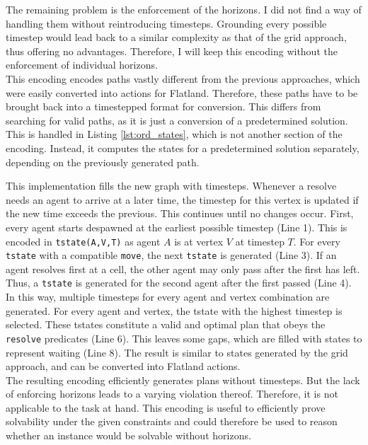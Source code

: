 \documentclass{llncs}
\begin{document}
\begin{multicols*}{2}
The remaining problem is the enforcement of the horizons. I did not find a way of handling them without reintroducing timesteps. Grounding every possible timestep would lead back to a similar complexity as that of the grid approach, thus offering no advantages. Therefore, I will keep this encoding without the enforcement of individual horizons.\\

This encoding encodes paths vastly different from the previous approaches, which were easily converted into actions for Flatland. Therefore, these paths have to be brought back into a timestepped format for conversion. This differs from searching for valid paths, as it is just a conversion of a predetermined solution. This is handled in Listing \ref{lst:ord_states}, which is not another section of the encoding. Instead, it computes the states for a predetermined solution separately, depending on the previously generated path.

This implementation fills the new graph with timesteps. Whenever a resolve needs an agent to arrive at a later time, the timestep for this vertex is updated if the new time exceeds the previous. This continues until no changes occur. First, every agent starts despawned at the earliest possible timestep (Line 1). This is encoded in \texttt{tstate(A,V,T)} as agent $A$ is at vertex $V$ at timestep $T$. For every \texttt{tstate} with a compatible \texttt{move}, the next \texttt{tstate} is generated (Line 3). If an agent resolves first at a cell, the other agent may only pass after the first has left. Thus, a \texttt{tstate} is generated for the second agent after the first passed (Line 4). In this way, multiple timesteps for every agent and vertex combination are generated. For every agent and vertex, the tstate with the highest timestep is selected. These tstates constitute a valid and optimal plan that obeys the \texttt{resolve} predicates (Line 6). This leaves some gaps, which are filled with states to represent waiting (Line 8). The result is similar to states generated by the grid approach, and can be converted into Flatland actions.\\

The resulting encoding efficiently generates plans without timesteps. But the lack of enforcing horizons leads to a varying violation thereof. Therefore, it is not applicable to the task at hand. This encoding is useful to efficiently prove solvability under the given constraints and could therefore be used to reason whether an instance would be solvable without horizons.


\end{multicols*}
\end{document}

